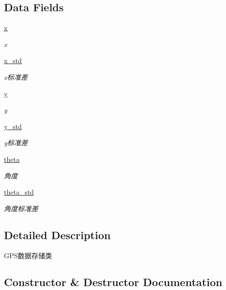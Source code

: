 \subsection*{Data Fields}
\begin{DoxyCompactItemize}
\item 
\hyperlink{classselect___a_1_1_g_p_s__unit_a54482f7ba1a9c93005609cf6e7ea5469}{x}
\begin{DoxyCompactList}\small\item\em x \end{DoxyCompactList}\item 
\hyperlink{classselect___a_1_1_g_p_s__unit_a7089d2a98b9f9cbf4f2006c52c0ddf36}{x\+\_\+std}
\begin{DoxyCompactList}\small\item\em x标准差 \end{DoxyCompactList}\item 
\hyperlink{classselect___a_1_1_g_p_s__unit_a8f56e5e60f499d88c6fc2efcea092e5c}{y}
\begin{DoxyCompactList}\small\item\em y \end{DoxyCompactList}\item 
\hyperlink{classselect___a_1_1_g_p_s__unit_ae32815d6ce5a57a6b1b66438c4c8d5dc}{y\+\_\+std}
\begin{DoxyCompactList}\small\item\em y标准差 \end{DoxyCompactList}\item 
\hyperlink{classselect___a_1_1_g_p_s__unit_a63cba7b2867eab0113720c3db2a88cd2}{theta}
\begin{DoxyCompactList}\small\item\em 角度 \end{DoxyCompactList}\item 
\hyperlink{classselect___a_1_1_g_p_s__unit_a1d1f84e8ad3d5d6e72bb27273111a6d9}{theta\+\_\+std}
\begin{DoxyCompactList}\small\item\em 角度标准差 \end{DoxyCompactList}\end{DoxyCompactItemize}


\subsection{Detailed Description}
G\+P\+S数据存储类 



\subsection{Constructor \& Destructor Documentation}
\mbox{\label{classselect___a_1_1_g_p_s__unit_ab2b3df72f775ec31378b7aa46535ed12}} 
